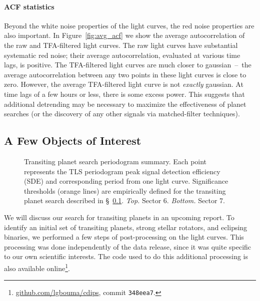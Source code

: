 \documentclass[12pt,twocolumn,tighten]{aastex62}
\begin{document}
\paragraph{ACF statistics}

Beyond the white noise properties of the light curves, the red noise
properties are also important. 
In Figure~\ref{fig:avg_acf} we show the average autocorrelation of the
raw and TFA-filtered light curves.
The raw light curves have substantial systematic red noise; 
their average autocorrelation, evaluated at various time lags, is
positive.
The TFA-filtered light curves are much closer to gaussian~--~the
average autocorrelation between any two points in these light curves
is close to zero.
However, the average TFA-filtered light curve is not {\it exactly}
gaussian.
At time lags of a few hours or less, there is some excess power.
This suggests that additional detrending may be
necessary to maximize the effectiveness of planet searches (or the discovery of
any other signals via matched-filter techniques).


\subsection{A Few Objects of Interest}
\label{subsec:identifying_variability}

\begin{figure}[!t]
	\vspace{-0.8cm}
	\caption{
    Transiting planet search periodogram summary.
    Each point represents the TLS periodogram peak signal detection
    efficiency (SDE) and corresponding period from one light curve.
    Significance thresholds (orange lines) are empirically defined for
    the transiting planet search described in
    \S~\ref{subsec:identifying_variability}.  
    {\it Top.} Sector 6.  {\it Bottom.} Sector 7.
	}
	\label{fig:tlsresults}
\end{figure}

We will discuss our search for transiting planets in an upcoming
report.  To identify an initial set of transiting planets, strong
stellar rotators, and eclipsing binaries, we performed a few steps of
post-processing on the light curves.  This processing was done
independently of the data release, since it was quite specific to our
own scientific interests.  The code used to do this additional
processing is also available
online\footnote{\url{github.com/lgbouma/cdips}, commit
\texttt{348eea7}.}.
\end{document}
